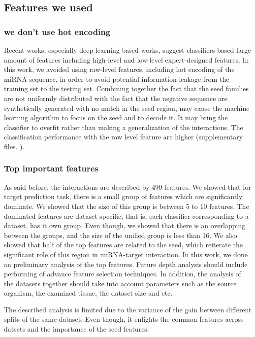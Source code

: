 \documentclass{bmcart}
\begin{document}
\subsection*{Features we used}
\subsubsection*{we don't use hot encoding}
Recent works, especially deep learning based works, suggest classifiers based large amount of features including high-level and low-level expert-designed features. In this work, we avoided using raw-level features, including hot encoding of the miRNA sequence, in order to avoid potential information leakage from the training set to the testing set. Combining together the fact that the seed families are not uniformly distributed with the fact that the negative sequence are synthetically generated with no match in the seed region, may cause the machine learning algorithm to focus on the seed and to decode it. It may bring the classifier to overfit rather than making a generalization of the interactions. The classification performance with the raw level feature are higher (supplementary files. ).

\subsubsection*{Top important features}
As said before, the interactions are described by 490 features. We showed that for target prediction task, there is a small group of features which are significantly dominate. We showed that the size of this group is between 5 to 10 features. The dominated features are dataset specific, that is, each classifier corresponding to a dataset, has it own group. Even though, we showed that there is an overlapping between the groups, and the size of the unified group is less than 16. We also showed that half of the top features are related to the seed, which reiterate the significant role of this region in miRNA-target interaction. 
In this work, we done an preliminary analysis of the top features. Future depth analysis should include performing of advance feature selection techniques. In addition, the analysis of the datasets together should take into account parameters such as the source organism, the examined tissue, the dataset size and etc. 


The described analysis is limited due to the variance of the gain between different splits of the same dataset. Even though, it enlights the common features across datsets and the importance of the seed features.
\end{document}
